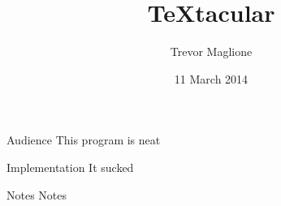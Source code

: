 \documentclass[style=paintings]{powerdot}
\title{\TeX tacular}
\author{Trevor Maglione}
\date{11 March 2014}
\begin{document}
\maketitle
\begin{slide}{Audience}
  This program is neat
\end{slide}
\begin{slide}{Implementation}
  It sucked
\end{slide}
\begin{slide}{Notes}
  Notes
\end{slide}
\end{document}
